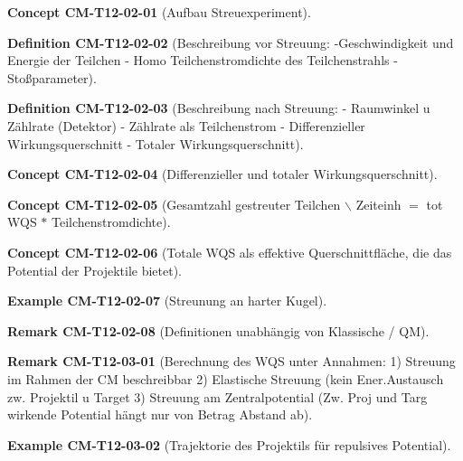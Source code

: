\documentclass[10pt, letterpaper]{article}
\newcommand{\CustomHeading}[3]{%
  \par\medskip\noindent%
  \textbf{#1 #2} \textnormal{(#3)}.\enskip%
}
\newenvironment{DEF}[2]{\CustomHeading{Definition}{#1}{#2}}{}
\newenvironment{REM}[2]{\CustomHeading{Remark}{#1}{#2}}{}
\newenvironment{EXA}[2]{\CustomHeading{Example}{#1}{#2}}{}
\newenvironment{CONC}[2]{\CustomHeading{Concept}{#1}{#2}}{}
\begin{document}
\begin{CONC}{CM-T12-02-01}{Aufbau Streuexperiment}
\end{CONC}

\begin{DEF}{CM-T12-02-02}{Beschreibung vor Streuung:
-Geschwindigkeit und Energie der Teilchen
- Homo Teilchenstromdichte des Teilchenstrahls
- Stoßparameter}
\end{DEF}

\begin{DEF}{CM-T12-02-03}{Beschreibung nach Streuung:
- Raumwinkel u Zählrate (Detektor)
- Zählrate als Teilchenstrom
- Differenzieller Wirkungsquerschnitt
- Totaler Wirkungsquerschnitt}
\end{DEF}

\begin{CONC}{CM-T12-02-04}{Differenzieller und totaler Wirkungsquerschnitt}
\end{CONC}

\begin{CONC}{CM-T12-02-05}{Gesamtzahl gestreuter Teilchen $\backslash$ Zeiteinh $=$ tot WQS $*$ Teilchenstromdichte}
\end{CONC}

\begin{CONC}{CM-T12-02-06}{Totale WQS als effektive Querschnittfläche, die das Potential der Projektile bietet}
\end{CONC}

\begin{EXA}{CM-T12-02-07}{Streunung an harter Kugel}
\end{EXA}

\begin{REM}{CM-T12-02-08}{Definitionen unabhängig von Klassische / QM}
\end{REM}

\begin{REM}{CM-T12-03-01}{Berechnung des WQS unter Annahmen:
1) Streuung im Rahmen der CM beschreibbar
2) Elastische Streuung (kein Ener.Austausch zw. Projektil u Target
3) Streuung am Zentralpotential (Zw. Proj und Targ wirkende Potential hängt nur von Betrag Abstand ab}
\end{REM}

\begin{EXA}{CM-T12-03-02}{Trajektorie des Projektils für repulsives Potential}
\end{EXA}
\end{document}
